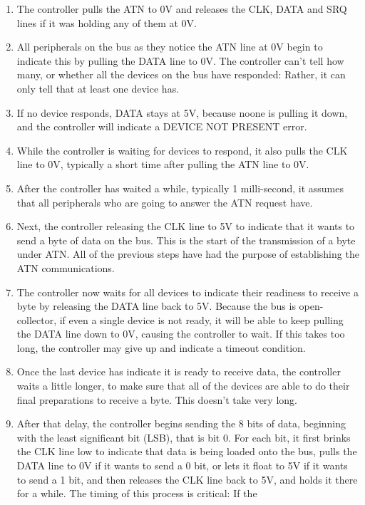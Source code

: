 \begin{enumerate}
\item The controller pulls the ATN to 0V and releases the CLK, DATA
  and SRQ lines if it was holding any of them at 0V.
\item All peripherals on the bus as they notice the ATN line at 0V
  begin to indicate this by pulling the DATA line to 0V.
  The controller can't tell how many, or whether all the devices
  on the bus have responded: Rather, it can only tell that at least
  one device has.
\item If no device responds, DATA stays at 5V, because noone is
  pulling it down, and the
  controller will indicate a DEVICE NOT PRESENT error.
\item While the controller is waiting for devices to respond, it
  also pulls the CLK line to 0V, typically a short time after
  pulling the ATN line to 0V.
\item After the controller has waited a while, typically 1
  milli-second, it assumes that all peripherals who are going to
  answer the ATN request have.
\item Next, the controller releasing the CLK line to 5V to indicate
  that it wants to send a byte of data on the bus. This is the start
  of the transmission of a byte under ATN. All of the previous steps
  have had the purpose of establishing the ATN communications.
\item The controller now waits for all devices to indicate
  their readiness to receive a byte by releasing the DATA line
  back to 5V. Because the bus is open-collector, if even a
  single device is not ready, it will be able to keep pulling
  the DATA line down to 0V, causing the controller to wait.
  If this takes too long, the controller may give up and
  indicate a timeout condition.
\item Once the last device has indicate it is ready to receive data,
  the controller waits a little longer, to make sure that all of the
  devices are able to do their final preparations to receive a
  byte. This doesn't take very long.
\item After that delay, the controller begins sending the 8 bits of
  data, beginning with the least significant bit (LSB), that is bit
  0. For each bit, it first brinks the CLK line low to indicate that
  data is being loaded onto the bus, pulls the DATA line to 0V if it
  wants to send a 0 bit, or lets it float to 5V if it wants to send
  a 1 bit, and then releases the CLK line back to 5V, and holds it
  there for a while.  The timing of this process is critical: If the

\end{enumerate}
